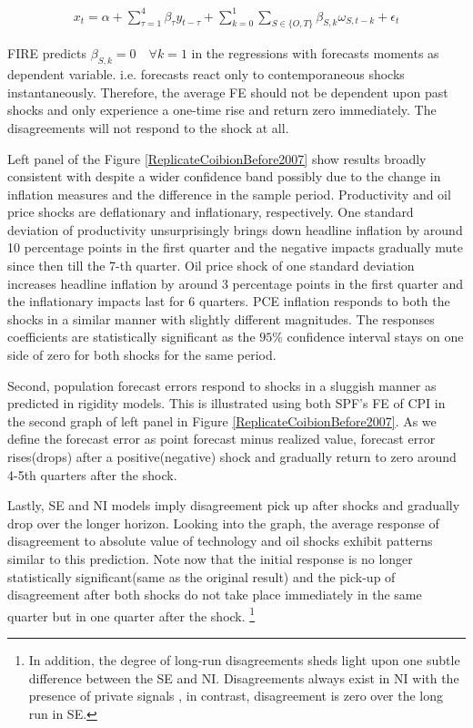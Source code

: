 \documentclass[]{article}
\begin{document}
	\begin{eqnarray}\label{IRRegression}
		x_{t}  = \alpha + \sum^4_{\tau=1} \beta_{\tau} y_{t-\tau} +  \sum^1_{k=0} \sum_{S \in \{O,T\}}\beta_{S,k}\omega_{S,t-k} + \epsilon_t 
	\end{eqnarray}
	
	FIRE predicts $\beta_{S,k}=0\quad \forall k=1$ in the regressions with forecasts moments as dependent variable. i.e. forecasts react only to contemporaneous shocks instantaneously. Therefore, the average FE should not be dependent upon past shocks and  only experience a one-time rise and return zero immediately. The disagreements will not respond to the shock at all. 
	
	Left panel of the Figure \ref{ReplicateCoibionBefore2007} show results broadly consistent with \citet{coibion2012can} despite a wider confidence band possibly due to the change in inflation measures and the difference in the sample period. Productivity and oil price shocks are deflationary and inflationary, respectively. One standard deviation of productivity unsurprisingly brings down headline inflation by around 10 percentage points  in the first quarter and the negative impacts gradually mute since then till the 7-th quarter. Oil price shock of one standard deviation increases headline inflation by around 3 percentage points in the first quarter and the inflationary impacts last for 6 quarters. PCE inflation responds to both the shocks in a similar manner with slightly different magnitudes. The responses coefficients are statistically significant as the $95\%$ confidence interval stays on one side of zero for both shocks for the same period. 
	
	Second, population forecast errors respond to shocks in a sluggish manner as predicted in rigidity models. This is illustrated using both SPF's FE of CPI in the second graph of  left panel in Figure \ref{ReplicateCoibionBefore2007}. As we define the forecast error as point forecast minus realized value, forecast error rises(drops) after a positive(negative) shock and gradually return to zero around 4-5th quarters after the shock. 
	
	Lastly, SE and NI models imply disagreement pick up after shocks and gradually drop over the longer horizon.  Looking into the graph, the average response of disagreement to absolute value of  technology and oil shocks exhibit patterns similar to this prediction. Note now that the initial response is no longer statistically significant(same as the original result) and the pick-up of disagreement after both shocks do not take place immediately in the same quarter but in one quarter after the shock. \footnote{In addition, the degree of long-run disagreements sheds light upon one subtle difference between the SE and NI. Disagreements always exist in NI with the presence of private signals , in contrast, disagreement is zero over the long run in SE. }
	
\end{document}

